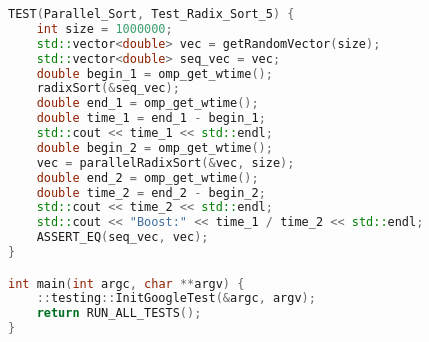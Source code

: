 \documentclass{report}
\begin{document}
\begin{lstlisting}[language=C++]
TEST(Parallel_Sort, Test_Radix_Sort_5) {
    int size = 1000000;
    std::vector<double> vec = getRandomVector(size);
    std::vector<double> seq_vec = vec;
    double begin_1 = omp_get_wtime();
    radixSort(&seq_vec);
    double end_1 = omp_get_wtime();
    double time_1 = end_1 - begin_1;
    std::cout << time_1 << std::endl;
    double begin_2 = omp_get_wtime();
    vec = parallelRadixSort(&vec, size);
    double end_2 = omp_get_wtime();
    double time_2 = end_2 - begin_2;
    std::cout << time_2 << std::endl;
    std::cout << "Boost:" << time_1 / time_2 << std::endl;
    ASSERT_EQ(seq_vec, vec);
}

int main(int argc, char **argv) {
    ::testing::InitGoogleTest(&argc, argv);
    return RUN_ALL_TESTS();
}
\end{lstlisting}
\end{document}
